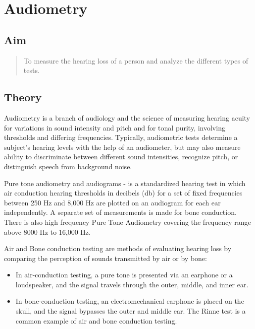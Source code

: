 \documentclass[
  11pt,
  letterpaper,
  DIV=11,
  numbers=noendperiod]{scrreprt}
\begin{document}

\chapter{Audiometry}\label{audiometry}

\section{Aim}\label{aim-4}

\begin{quote}
To measure the hearing loss of a person and analyze the different types
of tests.
\end{quote}

\section{Theory}\label{theory-4}

Audiometry is a branch of audiology and the science of measuring hearing
acuity for variations in sound intensity and pitch and for tonal purity,
involving thresholds and differing frequencies. Typically, audiometric
tests determine a subject's hearing levels with the help of an
audiometer, but may also measure ability to discriminate between
different sound intensities, recognize pitch, or distinguish speech from
background noise.

Pure tone audiometry and audiograms - is a standardized hearing test in
which air conduction hearing thresholds in decibels (db) for a set of
fixed frequencies between 250 Hz and 8,000 Hz are plotted on an
audiogram for each ear independently. A separate set of measurements is
made for bone conduction. There is also high frequency Pure Tone
Audiometry covering the frequency range above 8000 Hz to 16,000 Hz.

Air and Bone conduction testing are methods of evaluating hearing loss
by comparing the perception of sounds transmitted by air or by bone:

\begin{itemize}
\item
  In air-conduction testing, a pure tone is presented via an earphone or
  a loudspeaker, and the signal travels through the outer, middle, and
  inner ear.
\item
  In bone-conduction testing, an electromechanical earphone is placed on
  the skull, and the signal bypasses the outer and middle ear. The Rinne
  test is a common example of air and bone conduction testing.
\end{itemize}
\end{document}
